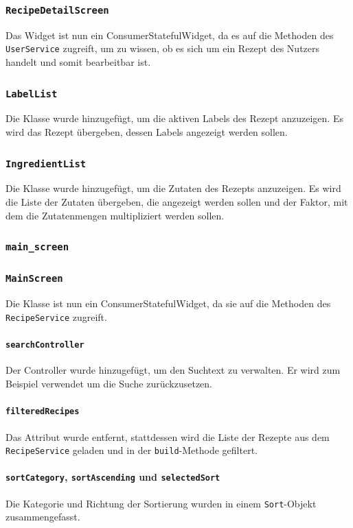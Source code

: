 \documentclass{implementierungsheft}
\begin{document}
\subsubsection*{\texttt{RecipeDetailScreen}}
Das Widget ist nun ein ConsumerStatefulWidget, da es auf die Methoden des \texttt{UserService} zugreift, um zu wissen, ob es sich um ein Rezept des Nutzers handelt und somit bearbeitbar ist.
\subsubsection*{\texttt{LabelList}}
Die Klasse wurde hinzugefügt, um die aktiven Labels des Rezept anzuzeigen. Es wird das Rezept übergeben, dessen Labels angezeigt werden sollen.
\subsubsection*{\texttt{IngredientList}}
Die Klasse wurde hinzugefügt, um die Zutaten des Rezepts anzuzeigen. Es wird die Liste der Zutaten übergeben, die angezeigt werden sollen und der Faktor, mit dem die Zutatenmengen multipliziert werden sollen.
\subsubsection{\texttt{main\_screen}}
\subsubsection*{\texttt{MainScreen}}
Die Klasse ist nun ein ConsumerStatefulWidget, da sie auf die Methoden des \texttt{RecipeService} zugreift.
\paragraph*{\texttt{searchController}}
Der Controller wurde hinzugefügt, um den Suchtext zu verwalten. Er wird zum Beispiel verwendet um die Suche zurückzusetzen.
\paragraph{\texttt{filteredRecipes}}
Das Attribut wurde entfernt, stattdessen wird die Liste der Rezepte aus dem \texttt{RecipeService} geladen und in der \texttt{build}-Methode gefiltert.
\paragraph{\texttt{sortCategory}, \texttt{sortAscending} und \texttt{selectedSort}} Die Kategorie und Richtung der Sortierung wurden in einem \texttt{Sort}-Objekt zusammengefasst.
\end{document}
